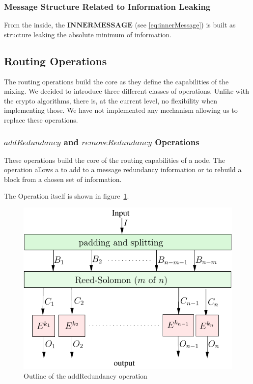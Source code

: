 \subsubsection{Message Structure Related to Information Leaking}
From the inside, the $\mathbf{INNERMESSAGE}$ (see \ref{eq:innerMessage}) is built as structure leaking the absolute minimum of information.


\subsection{Routing Operations}
The routing operations build the core as they define the capabilities of the mixing. We decided to introduce three different classes of operations. Unlike with the crypto algorithms, there is, at the current level, no flexibility when implementing those. We have not implemented any mechanism allowing us to replace these operations.

\subsubsection{$addRedundancy$ and $removeRedundancy$ Operations}
These operations build the core of the routing capabilities of a node. The operation allows a  to add to a message redundancy information or to rebuild a block from a chosen set of information. 

The Operation itself is shown in figure~\ref{fig:addRedundancyOperation}. 
\begin{figure}[ht]\centering
	\includegraphics[width=0.8\columnwidth]{inc/addRedundancyOp}
	\caption{Outline of the addRedundancy operation}
	\label{fig:addRedundancyOperation}
\end{figure}


